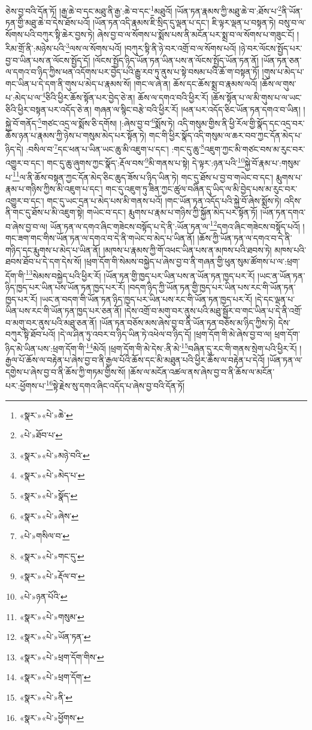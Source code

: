 ཅེས་བྱ་བའི་དོན་ཏོ། །རྒྱ་ཆེ་བ་དང་མཐུ་ནི་རྒྱ་:ཆེ་བ་དང་\footnote{«སྣར་»«པེ་»ཆེ་}མཐུའོ། །ཡོན་ཏན་རྣམས་ཀྱི་མཐུ་ཆེ་བ་:ཐོས་པ་\footnote{«པེ་»ཐོབ་པ་}ནི་ཡོན་ཏན་གྱི་མཐུ་ཆེ་བ་དེས་ཐོས་པའོ། །ཡོན་ཏན་འདི་རྣམས་ཇི་སྲིད་དུ་ལྡན་པ་དང་། ཇི་ལྟར་ལྡན་པ་བསྟན་ཏེ། བསུ་བ་ལ་སོགས་པའི་བཀུར་སྟི་ཆེར་བྱས་ཏེ། ཞེས་བྱ་བ་ལ་སོགས་པ་སྨོས་པས་ནི་མངོན་པར་སྨྲ་བ་ལ་སོགས་པ་གཟུང་ངོ། །རིམ་གྲོ་ནི་:མཉེས་པའི་\footnote{«སྣར་»«པེ་»མཉེ་བའི་}ལས་ལ་སོགས་པའོ། །བཀུར་སྟི་ནི་ཉེ་བར་འགྲོ་བ་ལ་སོགས་པའོ། །ཉེ་བར་ལོངས་སྤྱོད་པར་བྱ་བ་ཡིན་པས་ན་ལོངས་སྤྱོད་དོ། །ལོངས་སྤྱོད་ཉིད་ཡོན་ཏན་ཡིན་པས་ན་ལོངས་སྤྱོད་ཡོན་ཏན་ནོ། །ཡོན་ཏན་ཅན་ལ་དགའ་བ་ཉིད་ཀྱིས་ཕན་འདོགས་པར་བྱེད་པའི་རྒྱུ་རབ་ཏུ་ནུས་པ་སྟེ་བསམ་པའི་ཆོ་ག་བསྟན་ཏོ། །གུས་པ་མེད་པ་གང་ཡིན་པ་དེ་དག་ནི་གུས་པ་མེད་པ་རྣམས་སོ། །གང་ལ་ཞེ་ན། ཆོས་དང་ཆོས་སྨྲ་བ་རྣམས་ལའོ། །ཆོས་ལ་གུས་པ་:མེད་པ་ལ་\footnote{«སྣར་»«པེ་»མེད་པ་}ཅིའི་ཕྱིར་ཆོས་སྟོན་པར་བྱེད་ཅེ་ན། ཆོས་ལ་དགའ་བའི་ཕྱིར་རོ། །ཆོས་སྟོན་པ་ལ་མི་གུས་པ་ལ་ཡང་ཅིའི་ཕྱིར་བསྟན་པར་འདོད་ཅེ་ན། གཞན་ལ་སྙིང་བརྩེ་བའི་ཕྱིར་རོ། །ཕན་པར་འདོད་ཅིང་ཡོན་ཏན་དགའ་བ་ཡིན། །སྐྱེ་བོ་གནོད་\footnote{«སྣར་»«པེ་»སྣོད་}གཙང་འདྲ་ལ་སྨོས་ཅི་དགོས། །:ཞེས་བྱ་བ་\footnote{«སྣར་»«པེ་»ཞེས་}སྨོས་ཏེ། འདི་གསུམ་གྱིས་ནི་ཕྱི་རོལ་གྱི་སྣོད་དང་འདྲ་བར་ཆོས་ཉན་པ་རྣམས་ཀྱི་ཉེས་པ་གསུམ་མེད་པར་སྟོན་ཏེ། གང་གི་ཕྱིར་སྣོད་འདི་གསུམ་ལ་ཆར་བབ་ཀྱང་དོན་མེད་པ་ཉིད་དེ། :བསིལ་བ་\footnote{«པེ་»གསིལ་བ་}དང་ཕན་པ་ཡིན་ཡང་ཆུ་མི་འཇུག་པ་དང་། :གང་དུ་ཆུ་\footnote{«སྣར་»«པེ་»གང་དུ་}འཇུག་ཀྱང་མི་གཙང་བས་མ་རུང་བར་འགྱུར་བ་དང་། གང་དུ་ཆུ་ཞུགས་ཀྱང་སྣོད་:རྡོལ་བས་\footnote{«སྣར་»«པེ་»རྡོལ་བ་}མི་གནས་པ་སྟེ། དེ་ལྟར་:ཉན་པའི་\footnote{«པེ་»ཉན་པོའི་}སྐྱེ་བོ་རྣམ་པ་:གསུམ་པ་\footnote{«སྣར་»«པེ་»གསུམ་}ལ་ནི་ཆོས་བསྟན་ཀྱང་དོན་མེད་ཅིང་ཆུད་ཟོས་པ་ཉིད་ཡིན་ཏེ། གང་དུ་ཐོས་པ་བྱ་བ་གཡེང་བ་དང་། རྨུགས་པ་རྣམ་པ་གཉིས་ཀྱིས་མི་འཇུག་པ་དང་། གང་དུ་འཇུག་ཏུ་ཟིན་ཀྱང་ཚུལ་བཞིན་དུ་ཡིད་ལ་མི་བྱེད་པས་མ་རུང་བར་འགྱུར་བ་དང་། གང་དུ་ཡང་དྲན་པ་མེད་པས་མི་གནས་པའོ། །གང་ཡོན་ཏན་འདོད་པའི་སྐྱེ་བོ་ཞེས་སྨོས་ཏེ། འདིས་ནི་གང་དུ་ཐོས་པ་མི་འཇུག་སྟེ། གཡེང་བ་དང་། རྨུགས་པ་རྣམ་པ་གཉིས་ཀྱི་སྐྱོན་མེད་པར་སྟོན་ཏོ། །ཡོན་ཏན་དགའ་བ་ཞེས་བྱ་བ་ལ། ཡོན་ཏན་ལ་དགའ་ཞིང་གཟེངས་བསྟོད་པ་དེ་ནི་:ཡོན་ཏན་ལ་\footnote{«སྣར་»«པེ་»ཡོན་ཏན་}དགའ་ཞིང་གཟེངས་བསྟོད་པའོ། །གང་ཟག་གང་གིས་ཡོན་ཏན་ལ་དགའ་བ་དེ་ནི་གཡེང་བ་མེད་པ་ཡིན་ནོ། །ཆོས་ཀྱི་ཡོན་ཏན་ལ་དགའ་བ་དེ་ནི་གཉིད་དང་རྨུགས་པ་མེད་པ་ཡིན་ནོ། །མཁས་པ་རྣམས་ཀྱི་གོ་འཕང་ཡིན་པས་ན་མཁས་པའི་ཐབས་ཏེ། མཁས་པའི་ཐབས་ཐོབ་པ་དེ་དག་དེས་སོ། །ཕྲག་དོག་གི་སེམས་བསྐྱེད་པ་ཞེས་བྱ་བ་ནི་གཞན་གྱི་ཕུན་སུམ་ཚོགས་པ་ལ་:ཕྲག་དོག་གི་\footnote{«སྣར་»«པེ་»ཕྲག་དོག་གིས་}སེམས་བསྐྱེད་པའི་ཕྱིར་རོ། །ཡོན་ཏན་གྱི་ཁྱད་པར་ཡིན་པས་ན་ཡོན་ཏན་ཁྱད་པར་རོ། །ཡང་ན་ཡོན་ཏན་ཉིད་ཁྱད་པར་ཡིན་པས་ཡོན་ཏན་ཁྱད་པར་རོ། །བདག་ཉིད་ཀྱི་ཡོན་ཏན་གྱི་ཁྱད་པར་ཡིན་པས་རང་གི་ཡོན་ཏན་ཁྱད་པར་རོ། །ཡང་ན་བདག་གི་ཡོན་ཏན་ཉིད་ཁྱད་པར་ཡིན་པས་རང་གི་ཡོན་ཏན་ཁྱད་པར་རོ། །དེ་དང་ལྡན་པ་ཡིན་པས་རང་གི་ཡོན་ཏན་ཁྱད་པར་ཅན་ནོ། །དེས་འགྲོ་བ་མགུ་བར་ནུས་པའི་མཐུ་སྦྱོར་བ་གང་ཡིན་པ་དེ་ནི་འགྲོ་བ་མགུ་བར་ནུས་པའི་མཐུ་ཅན་ནོ། །ཡོན་ཏན་བཅོས་མས་ཞེས་བྱ་བ་ནི་ཡོན་ཏན་བཅོས་མ་ཉིད་ཀྱིས་ཏེ། དེས་བཀུར་སྟི་ཐོབ་པའོ། །དེ་ལ་ཤིན་ཏུ་འབར་བ་ཉིད་ཡིན་ཏེ་འཕེལ་བ་ཉིད་དོ། །ཕྲག་དོག་གི་མེ་ཞེས་བྱ་བ་ལ། ཕྲག་དོག་ཉིད་མེ་ཡིན་པས་:ཕྲག་དོག་གི་\footnote{«སྣར་»«པེ་»ཕྲག་དོག་}མེའོ། །ཕྲག་དོག་གི་མེ་དེས་:ནི་མེ་\footnote{«སྣར་»«པེ་»ནི་}བཞིན་དུ་རང་གི་གནས་སྲེག་པའི་ཕྱིར་རོ། །རྒྱལ་པོ་ཆོས་ལ་བརྟེན་པ་ཞེས་བྱ་བ་ནི་རྒྱལ་པོའི་ཆོས་དང་མི་མཐུན་པའི་ཕྱིར་ཆོས་ལ་བརྟེན་པ་དེའོ། །ཡོན་ཏན་ལ་དགྱེས་པ་ཞེས་བྱ་བ་ནི་ཆོས་ཀྱི་གཏམ་གྱིས་སོ། །ཆོས་ལ་མངོན་འཚལ་ནས་ཞེས་བྱ་བ་ནི་ཆོས་ལ་མངོན་པར་:ཕྱོགས་པ་\footnote{«སྣར་»«པེ་»ཕྱོགས་}སྟེ་རྗེས་སུ་དགའ་ཞིང་འདོད་པ་ཞེས་བྱ་བའི་དོན་ཏོ། 